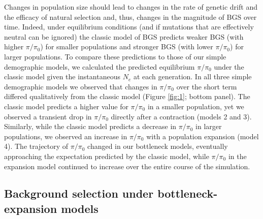 \documentclass[9pt,twocolumn,twoside]{rilabRxiv}
\begin{document}
Changes in population size should lead to changes in the rate of genetic drift and the efficacy of natural selection and, thus, changes in the magnitude of BGS over time.
Indeed, under equilibrium conditions (and if mutations that are effectively neutral can be ignored) the classic model of BGS \citep{nordborg1996effect} predicts weaker BGS (with higher $\pi/\pi_0$) for smaller populations and stronger BGS (with lower $\pi/\pi_0$) for larger populations.
To compare these predictions to those of our simple demographic models, we calculated the predicted equilibrium $\pi/\pi_0$ under the classic model given the instantaneous $N_e$ at each generation.
In all three simple demographic models we observed that changes in $\pi/\pi_0$ over the short term differed qualitatively from the classic model  (Figure \ref{fig:1}; bottom panel).
The classic model predicts a higher value for $\pi/\pi_0$ in a smaller population, yet we observed a transient drop in $\pi/\pi_0$ directly after a contraction (models 2 and 3).
Similarly, while the classic model predicts a decrease in $\pi/\pi_0$ in larger populations, we observed an increase in $\pi/\pi_0$ with a population expansion (model 4).
The trajectory of $\pi/\pi_0$ changed in our bottleneck models, eventually approaching the expectation predicted by the classic model, while $\pi/\pi_0$ in the expansion model continued to increase over the entire course of the simulation.

\subsection{Background selection under bottleneck-expansion models}
\end{document}
